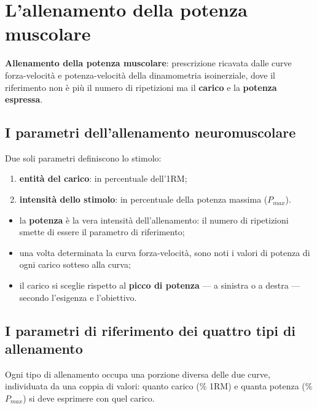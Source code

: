 \chapter{L'allenamento della potenza muscolare}

\textbf{Allenamento della potenza muscolare}: prescrizione ricavata dalle curve forza-velocità e
potenza-velocità della dinamometria isoinerziale, dove il riferimento non è più il numero di
ripetizioni ma il \textbf{carico} e la \textbf{potenza espressa}.

\section{I parametri dell'allenamento neuromuscolare}

Due soli parametri definiscono lo stimolo:
\begin{enumerate}
  \item \textbf{entità del carico}: in percentuale dell'1RM;
  \item \textbf{intensità dello stimolo}: in percentuale della potenza massima ($P_{max}$).
\end{enumerate}

\begin{itemize}
  \item la \textbf{potenza} è la vera intensità dell'allenamento: il numero di ripetizioni smette di
    essere il parametro di riferimento;
  \item una volta determinata la curva forza-velocità, sono noti i valori di potenza di ogni carico
    sotteso alla curva;
  \item il carico si sceglie rispetto al \textbf{picco di potenza} --- a sinistra o a destra ---
    secondo l'esigenza e l'obiettivo.
\end{itemize}

\section{I parametri di riferimento dei quattro tipi di allenamento}

Ogni tipo di allenamento occupa una porzione diversa delle due curve, individuata da una coppia di
valori: quanto carico (\% 1RM) e quanta potenza (\% $P_{max}$) si deve esprimere con quel carico.

